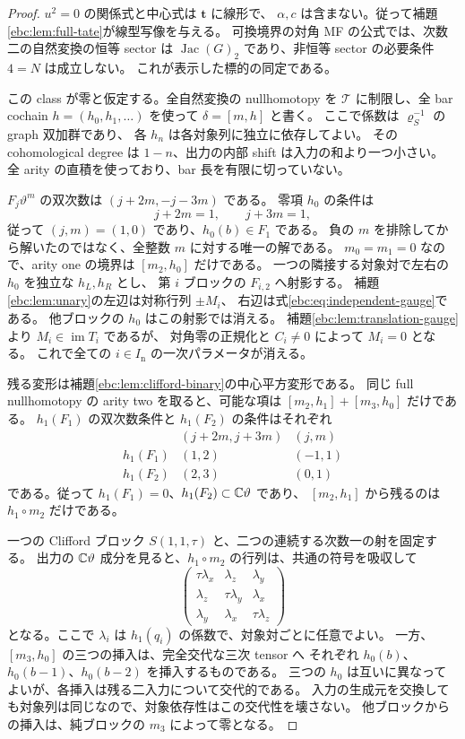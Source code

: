 \begin{proof}
$u^2=0$ の関係式と中心式は $\mathbf t$ に線形で、
$\alpha,c$ は含まない。従って補題\ref{ebc:lem:full-tate}が線型写像を与える。
可換境界の対角 MF の公式では、次数二の自然変換の恒等 sector は
$\operatorname{Jac}(G)_2$ であり、非恒等 sector の必要条件 $4=N$ は成立しない。
これが表示した標的の同定である。

この class が零と仮定する。全自然変換の nullhomotopy を
$\mathcal T$ に制限し、全 bar cochain $h=(h_0,h_1,\ldots)$ を使って
$\delta=[m,h]$ と書く。
ここで係数は $\varrho_S^{-1}$ の graph 双加群であり、
各 $h_n$ は各対象列に独立に依存してよい。
その cohomological degree は $1-n$、出力の内部 shift は入力の和より一つ小さい。
全 arity の直積を使っており、bar 長を有限に切っていない。

$F_j\vartheta^m$ の双次数は $(j+2m,-j-3m)$ である。
零項 $h_0$ の条件は
\[
 j+2m=1,\qquad j+3m=1,
\]
従って $(j,m)=(1,0)$ であり、$h_0(b)\in F_1$ である。
負の $m$ を排除してから解いたのではなく、全整数 $m$ に対する唯一の解である。
$m_0=m_1=0$ なので、arity one の境界は $[m_2,h_0]$ だけである。
一つの隣接する対象対で左右の $h_0$ を独立な $h_L,h_R$ とし、
第 $i$ ブロックの $F_{i,2}$ へ射影する。
補題\ref{ebc:lem:unary}の左辺は対称行列 $\pm M_i$、
右辺は式\eqref{ebc:eq:independent-gauge}である。
他ブロックの $h_0$ はこの射影では消える。
補題\ref{ebc:lem:translation-gauge}より $M_i\in\operatorname{im}T_i$ であるが、
対角零の正規化と $C_i\ne0$ によって $M_i=0$ となる。
これで全ての $i\in I_{\mathrm n}$ の一次パラメータが消える。

残る変形は補題\ref{ebc:lem:clifford-binary}の中心平方変形である。
同じ full nullhomotopy の arity two を取ると、可能な項は
$[m_2,h_1]+[m_3,h_0]$ だけである。
$h_1(F_1)$ の双次数条件と $h_1(F_2)$ の条件はそれぞれ
\[
 \begin{array}{c|c|c}
 & (j+2m,j+3m)&(j,m)\\\hline
 h_1(F_1)&(1,2)&(-1,1)\\
 h_1(F_2)&(2,3)&(0,1)
 \end{array}
\]
である。従って $h_1(F_1)=0$、$h_1(F_2)\subset\mathbb C\vartheta$ であり、
$[m_2,h_1]$ から残るのは $h_1\circ m_2$ だけである。

一つの Clifford ブロック $S(1,1,\tau)$ と、二つの連続する次数一の射を固定する。
出力の $\mathbb C\vartheta$ 成分を見ると、$h_1\circ m_2$ の行列は、共通の符号を吸収して
\begin{equation}\label{ebc:eq:clifford-binary-gauge}
 \begin{pmatrix}
 \tau\lambda_x&\lambda_z&\lambda_y\\
 \lambda_z&\tau\lambda_y&\lambda_x\\
 \lambda_y&\lambda_x&\tau\lambda_z
 \end{pmatrix}
\end{equation}
となる。ここで $\lambda_i$ は $h_1(q_i)$ の係数で、対象対ごとに任意でよい。
一方、$[m_3,h_0]$ の三つの挿入は、完全交代な三次 tensor へ
それぞれ $h_0(b)$、$h_0(b-1)$、$h_0(b-2)$ を挿入するものである。
三つの $h_0$ は互いに異なってよいが、各挿入は残る二入力について交代的である。
入力の生成元を交換しても対象列は同じなので、対象依存性はこの交代性を壊さない。
他ブロックからの挿入は、純ブロックの $m_3$ によって零となる。


\end{proof}
